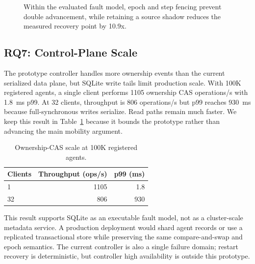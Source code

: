 \begin{figure}[t]
  \centering
  \caption{Within the evaluated fault model, epoch and step fencing prevent double advancement, while retaining a source shadow reduces the measured recovery point by 10.9x.}
  \label{fig:fault-recovery}
\end{figure}

\subsection{RQ7: Control-Plane Scale}\label{rq7-control-plane-scale}

The prototype controller handles more ownership events than the current serialized data plane, but SQLite write tails limit production scale. With 100K registered agents, a single client performs 1105 ownership CAS operations/s with 1.8~ms p99. At 32 clients, throughput is 806 operations/s but p99 reaches 930~ms because full-synchronous writes serialize. Read paths remain much faster. We keep this result in Table~\ref{tab:control} because it bounds the prototype rather than advancing the main mobility argument.

\begin{table}[t]
\centering
\small
\caption{Ownership-CAS scale at 100K registered agents.}
\label{tab:control}
\begin{tabular}{lrr}
\toprule
Clients & Throughput (ops/s) & p99 (ms) \\
\midrule
1 & 1105 & 1.8 \\
32 & 806 & 930 \\
\bottomrule
\end{tabular}
\end{table}

This result supports SQLite as an executable fault model, not as a cluster-scale metadata service. A production deployment would shard agent records or use a replicated transactional store while preserving the same compare-and-swap and epoch semantics. The current controller is also a single failure domain; restart recovery is deterministic, but controller high availability is outside this prototype.

